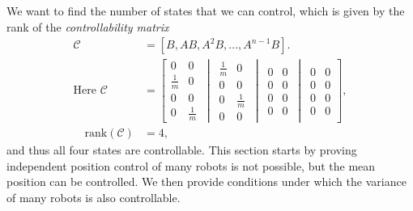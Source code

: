 We want to find the number of states that we can control, which is given by the rank of the \emph{controllability matrix}
\begin{align}
\mathcal{C} &= [ B, AB, A^2B, ... , A^{n-1}B ].\\
\textrm{Here }
\mathcal{C}&=\left[
\begin{matrix} 
0 & 0\\
\frac{1}{m} & 0 \\
0 & 0 \\
0 & \frac{1}{m}
\end{matrix}
\,\middle\vert\,
\begin{matrix} 
\frac{1}{m}& 0\\
0 & 0\\
0 & \frac{1}{m}\\
0 & 0
\end{matrix}
\,\middle\vert\,
\begin{matrix} 
0 & 0\\
0 & 0 \\
0 & 0 \\
0 & 0
\end{matrix}
\,\middle\vert\,
\begin{matrix} 
0 & 0\\
0 & 0\\
0 & 0\\
0 & 0
\end{matrix}
 \right],\\
 \quad \textrm{rank}(\mathcal{C})&=4,
\end{align}
and thus all four states are controllable. This section starts by proving independent position control of many robots is not possible, but the mean position can be controlled. We then provide conditions under which the variance of many robots is also controllable.


